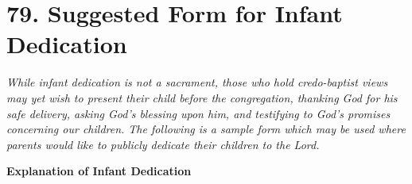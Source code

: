 \documentclass[
]{book}
\begin{document}
\hypertarget{suggested-form-for-infant-dedication}{%
\section*{79. Suggested Form for Infant Dedication}\label{suggested-form-for-infant-dedication}}

\protect\hypertarget{chapter-slug-79-suggested-form-for-infant-dedication}{\href{}{}}

\protect\hypertarget{79}{\href{}{}}\emph{While infant dedication is not a sacrament, those who hold credo-baptist views may yet wish to present their child before the congregation, thanking God for his safe delivery, asking God's blessing upon him, and testifying to God's promises concerning our children. The following is a sample form which may be used where parents would like to publicly dedicate their children to the Lord.}

\textbf{Explanation of Infant Dedication}
\end{document}
